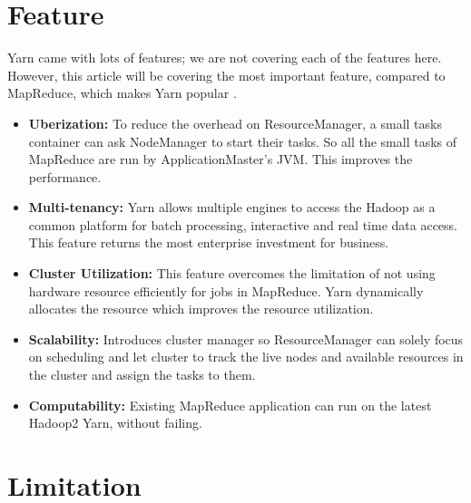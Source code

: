 \documentclass[9pt,twocolumn,twoside]{../../styles/osajnl}
\begin{document}
\section{Feature}

Yarn came with lots of features; we are not covering each of the features here. However, this article will be covering the most important feature, compared to MapReduce, which makes Yarn popular \cite{www-4}.

\begin{itemize}

	\item \textbf{Uberization:}  To reduce the overhead on ResourceManager, a small tasks container can ask NodeManager to start their tasks. So all the small tasks of MapReduce are run by ApplicationMaster’s JVM. This improves the performance.

	\item \textbf{Multi-tenancy:}  Yarn allows multiple engines to access the Hadoop as a common platform for batch processing, interactive and real time data access. This feature returns the most enterprise investment for business.

	\item \textbf{Cluster Utilization:}  This feature overcomes the limitation of not using hardware resource efficiently for jobs in MapReduce. Yarn dynamically allocates the resource which improves the resource utilization.

	\item \textbf{Scalability:}  Introduces cluster manager so ResourceManager can solely focus on scheduling and let cluster to track the live nodes and available resources in the cluster and assign the tasks to them.

	\item \textbf{Computability:} Existing MapReduce application can run on the latest Hadoop2 Yarn, without failing.

\end{itemize}

\section{Limitation}
\end{document}
